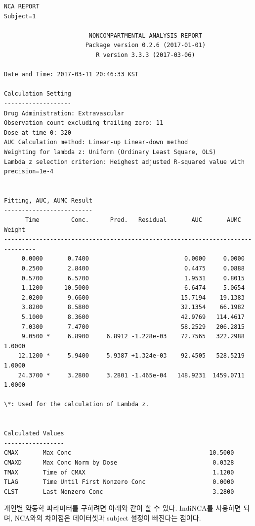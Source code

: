 \documentclass[]{krantz}
\theoremstyle{definition}
\theoremstyle{definition}
\theoremstyle{definition}
\theoremstyle{remark}
\begin{document}
\begin{verbatim}
NCA REPORT
Subject=1

                        NONCOMPARTMENTAL ANALYSIS REPORT
                       Package version 0.2.6 (2017-01-01)
                          R version 3.3.3 (2017-03-06)

Date and Time: 2017-03-11 20:46:33 KST

Calculation Setting
-------------------
Drug Administration: Extravascular
Observation count excluding trailing zero: 11
Dose at time 0: 320
AUC Calculation method: Linear-up Linear-down method
Weighting for lambda z: Uniform (Ordinary Least Square, OLS)
Lambda z selection criterion: Heighest adjusted R-squared value with precision=1e-4


Fitting, AUC, AUMC Result
-------------------------
      Time         Conc.      Pred.   Residual       AUC       AUMC      Weight
-------------------------------------------------------------------------------
     0.0000       0.7400                           0.0000     0.0000            
     0.2500       2.8400                           0.4475     0.0888            
     0.5700       6.5700                           1.9531     0.8015            
     1.1200      10.5000                           6.6474     5.0654            
     2.0200       9.6600                          15.7194    19.1383            
     3.8200       8.5800                          32.1354    66.1982            
     5.1000       8.3600                          42.9769   114.4617            
     7.0300       7.4700                          58.2529   206.2815            
     9.0500 *     6.8900     6.8912 -1.228e-03    72.7565   322.2988     1.0000
    12.1200 *     5.9400     5.9387 +1.324e-03    92.4505   528.5219     1.0000
    24.3700 *     3.2800     3.2801 -1.465e-04   148.9231  1459.0711     1.0000

\*: Used for the calculation of Lambda z.


Calculated Values
-----------------
CMAX       Max Conc                                       10.5000
CMAXD      Max Conc Norm by Dose                           0.0328
TMAX       Time of CMAX                                    1.1200
TLAG       Time Until First Nonzero Conc                   0.0000
CLST       Last Nonzero Conc                               3.2800
\end{verbatim}

개인별 약동학 파라미터를 구하려면 아래와 같이 할 수 있다. IndiNCA를
사용하면 되며, NCA와의 차이점은 데이터셋과 subject 설정이 빠진다는
점이다.
\end{document}
